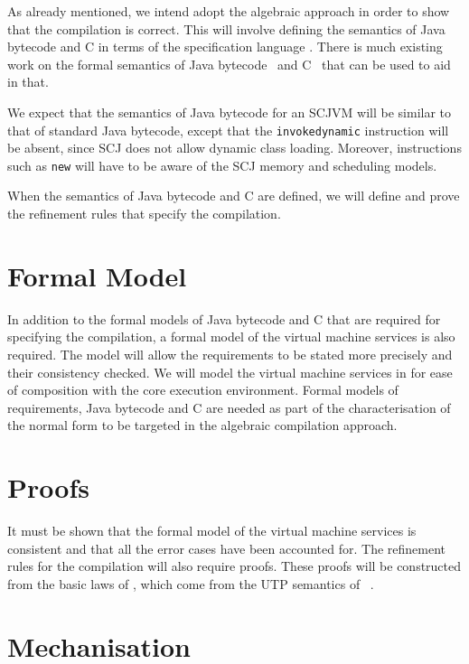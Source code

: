 \documentclass[a4paper,10pt]{report}
\begin{document}
As already mentioned, we intend adopt the algebraic approach in order
to show that the compilation is correct.
This will involve defining the semantics of Java bytecode and C in
terms of the specification language \Circus{}.
There is much existing work on the formal semantics of Java
bytecode~\cite{bertelsen2000, jones1998, stark2001, alves1999a,
  bogdanas2015, lochbihler2012a} and C~\cite{campbell2012,
  ellison2012, krebbers2014} that can be used to aid in that.

We expect that the semantics of Java bytecode for an SCJVM will be
similar to that of standard Java bytecode, except that the
\texttt{invokedynamic} instruction will be absent, since SCJ does not
allow dynamic class loading.
Moreover, instructions such as \texttt{new} will have to be aware of
the SCJ memory and scheduling models.

When the semantics of Java bytecode and C are defined, we will define
and prove the refinement rules that specify the compilation.

\section{Formal Model}

In addition to the formal models of Java bytecode and C that are
required for specifying the compilation, a formal model of the virtual
machine services is also required.
The model will allow the requirements to be stated more precisely and
their consistency checked.
We will model the virtual machine services in \Circus{} for ease of
composition with the core execution environment.
Formal models of requirements, Java bytecode and C are needed as part
of the characterisation of the normal form to be targeted in the
algebraic compilation approach. 

\section{Proofs}

It must be shown that the formal model of the virtual machine services
is consistent and that all the error cases have been accounted for.
The refinement rules for the compilation will also require proofs.
These proofs will be constructed from the basic laws of \Circus{},
which come from the UTP semantics of \Circus{}~\cite{oliveira2009}.

\section{Mechanisation}
\end{document}
